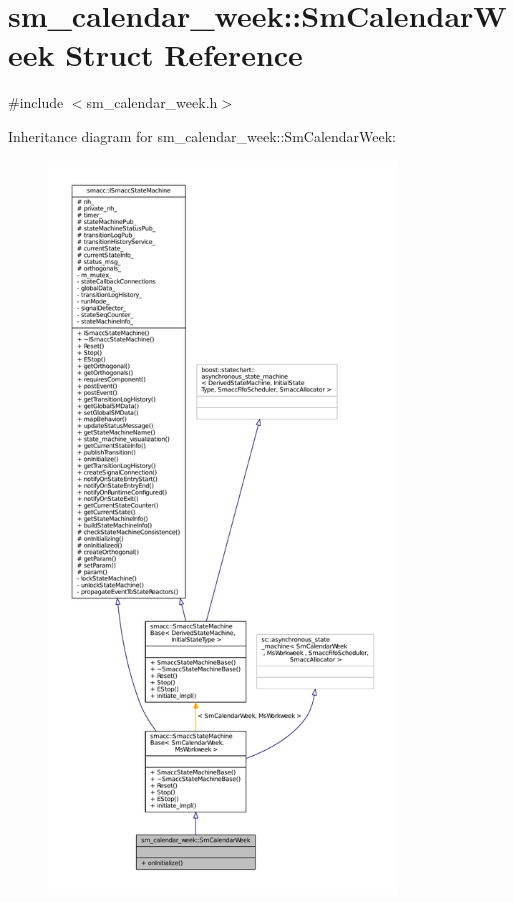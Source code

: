 \hypertarget{structsm__calendar__week_1_1SmCalendarWeek}{}\section{sm\+\_\+calendar\+\_\+week\+:\+:Sm\+Calendar\+Week Struct Reference}
\label{structsm__calendar__week_1_1SmCalendarWeek}


{\ttfamily \#include $<$sm\+\_\+calendar\+\_\+week.\+h$>$}



Inheritance diagram for sm\+\_\+calendar\+\_\+week\+:\+:Sm\+Calendar\+Week\+:
\nopagebreak
\begin{figure}[H]
\begin{center}
\leavevmode
\includegraphics[height=550pt]{structsm__calendar__week_1_1SmCalendarWeek__inherit__graph}
\end{center}
\end{figure}



